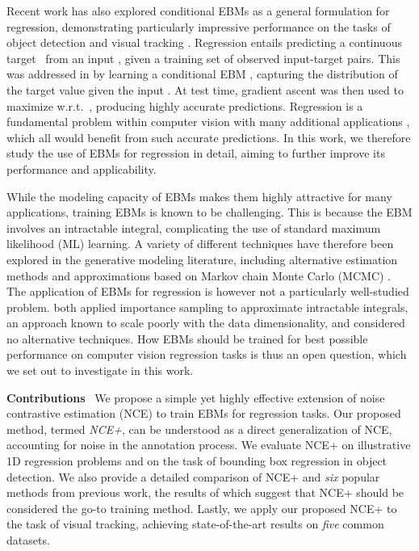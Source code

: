 \documentclass{bmvc2k}
\newcommand{\parsection}[1]{\vspace{2mm}\noindent\textbf{#1}~ }
\begin{document}
Recent work \cite{gustafsson2019learning, danelljan2020probabilistic} has also explored conditional EBMs as a general formulation for regression, demonstrating particularly impressive performance on the tasks of object detection \cite{Ren2015FasterRT, law2018cornernet, zhou2019bottom} and visual tracking \cite{SiamRPN++, danelljan2019atom, bhat2019learning}. Regression entails predicting a continuous target~ from an input , given a training set of observed input-target pairs. This was addressed in \cite{gustafsson2019learning, danelljan2020probabilistic} by learning a conditional EBM , capturing the distribution of the target value  given the input . At test time, gradient ascent was then used to maximize  w.r.t.\ , producing highly accurate predictions. Regression is a fundamental problem within computer vision with many additional applications \cite{lathuiliere2019comprehensive, xiao2018simple, yang2019fsa, rothe2016deep, pan2018mean}, which all would benefit from such accurate predictions. In this work, we therefore study the use of EBMs for regression in detail, aiming to further improve its performance and applicability.

While the modeling capacity of EBMs makes them highly attractive for many applications, training EBMs is known to be challenging. This is because the EBM  involves an intractable integral, complicating the use of standard maximum likelihood (ML) learning. A variety of different techniques have therefore been explored in the generative modeling literature, including alternative estimation methods \cite{gutmann2010noise, gao2019flow, hyvarinen2005estimation, vincent2011connection, song2019generative} and approximations based on Markov chain Monte Carlo (MCMC) \cite{hinton2002training, du2019implicit, nijkamp2019learning, nijkamp2019anatomy}. The application of EBMs for regression is however not a particularly well-studied problem. \cite{gustafsson2019learning, danelljan2020probabilistic} both applied importance sampling to approximate intractable integrals, an approach known to scale poorly with the data dimensionality, and considered no alternative techniques. How EBMs  should be trained for best possible performance on computer vision regression tasks is thus an open question, which we set out to investigate in this work.

\parsection{Contributions}
We propose a simple yet highly effective extension of noise contrastive estimation (NCE) \cite{gutmann2010noise} to train EBMs  for regression tasks. Our proposed method, termed \textit{NCE+}, can be understood as a direct generalization of NCE, accounting for noise in the annotation process. We evaluate NCE+ on illustrative 1D regression problems and on the task of bounding box regression in object detection. We also provide a detailed comparison of NCE+ and \emph{six} popular methods from previous work, the results of which suggest that NCE+ should be considered the go-to training method. Lastly, we apply our proposed NCE+ to the task of visual tracking, achieving state-of-the-art results on \emph{five} common datasets. 
\end{document}
